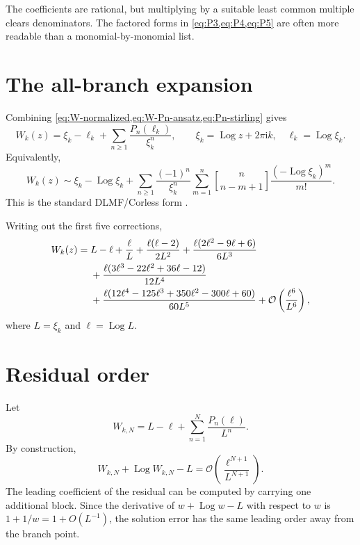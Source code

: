 \documentclass[11pt,openany]{book}
\theoremstyle{definition}
\theoremstyle{plain}
\theoremstyle{remark}
\newcommand{\ii}{\mathrm{i}}
\newcommand{\bigO}{\mathcal{O}}
\newcommand{\stirlingone}[2]{\genfrac{[}{]}{0pt}{}{#1}{#2}}
\DeclareMathOperator{\Log}{Log}
\begin{document}
The coefficients are rational, but multiplying by a suitable least common multiple clears denominators. The factored forms in \cref{eq:P3,eq:P4,eq:P5} are often more readable than a monomial-by-monomial list.

\section{The all-branch expansion}
Combining \cref{eq:W-normalized,eq:W-Pn-ansatz,eq:Pn-stirling} gives
\begin{equation}\label{eq:W-Pn-expansion}
 W_k(z)=\xi_k-\ell_k+
 \sum_{n\ge1}\frac{P_n(\ell_k)}{\xi_k^n},
 \qquad
 \xi_k=\Log z+2\pi\ii k,
 \quad \ell_k=\Log\xi_k.
\end{equation}
Equivalently,
\begin{equation}\label{eq:W-DLMF-form}
 W_k(z)\sim\xi_k-\Log\xi_k
 +\sum_{n\ge1}\frac{(-1)^n}{\xi_k^n}
 \sum_{m=1}^{n}
 \stirlingone{n}{n-m+1}
 \frac{(-\Log\xi_k)^m}{m!}.
\end{equation}
This is the standard DLMF/Corless form \cite{dlmf-W,corless-W,jeffrey-W}.

Writing out the first five corrections,
\begin{align}
 W_k(z)={}&L-\ell+\frac{\ell}{L}
 +\frac{\ell(\ell-2)}{2L^2}
 +\frac{\ell(2\ell^2-9\ell+6)}{6L^3}\notag\\
 &+\frac{\ell(3\ell^3-22\ell^2+36\ell-12)}{12L^4}\notag\\
 &+\frac{\ell(12\ell^4-125\ell^3+350\ell^2-300\ell+60)}{60L^5}
 +\bigO\left(\frac{\ell^6}{L^6}\right),
\label{eq:W-five-corrections}
\end{align}
where \(L=\xi_k\) and \(\ell=\Log L\).

\section{Residual order}
Let
\begin{equation}\label{eq:WN}
 W_{k,N}=L-\ell+\sum_{n=1}^{N}\frac{P_n(\ell)}{L^n}.
\end{equation}
By construction,
\begin{equation}\label{eq:W-residual-order}
 W_{k,N}+\Log W_{k,N}-L
 =\bigO\left(\frac{\ell^{N+1}}{L^{N+1}}\right).
\end{equation}
The leading coefficient of the residual can be computed by carrying one additional block. Since the derivative of \(w+\Log w-L\) with respect to \(w\) is \(1+1/w=1+O(L^{-1})\), the solution error has the same leading order away from the branch point.
\end{document}
